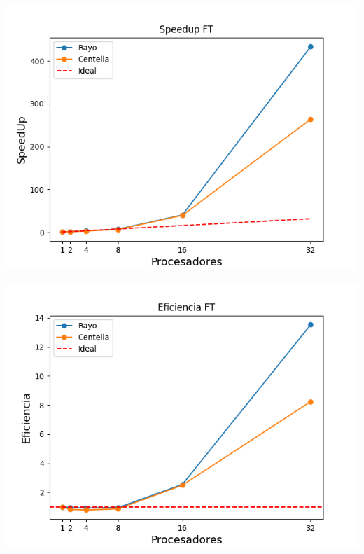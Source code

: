 \begin{center}
 \centering
 \begin{minipage}[b]{.49\textwidth}
  \includegraphics[width=1\linewidth]{plots/speed-up-ft.png}
  \label{ft:speedup}
 \end{minipage}
 \begin{minipage}[b]{.49\textwidth}
  \includegraphics[width=1\linewidth]{plots/efficiency-ft.png}
 \end{minipage}
\end{center}


